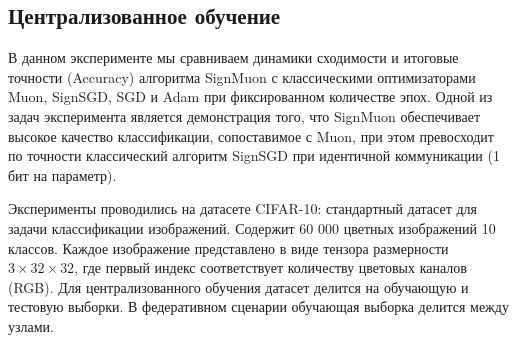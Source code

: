 \documentclass{article}
\begin{document}
\subsection{Централизованное обучение}
В данном эксперименте мы сравниваем динамики сходимости и итоговые точности (Accuracy) алгоритма SignMuon с классическими оптимизаторами Muon, SignSGD, SGD и Adam при фиксированном количестве эпох. Одной из задач эксперимента является демонстрация того, что SignMuon обеспечивает высокое качество классификации, сопоставимое с Muon, при этом превосходит по точности классический алгоритм SignSGD при идентичной коммуникации (1 бит на параметр).  


Эксперименты проводились на датасете CIFAR-10: стандартный датасет для задачи классификации изображений. Содержит 60 000 цветных изображений 10 классов. Каждое изображение представлено в виде тензора размерности $3 \times 32 \times 32$, где первый индекс соответствует количеству цветовых каналов (RGB). Для централизованного обучения датасет делится на обучающую и тестовую выборки. В федеративном сценарии обучающая выборка делится между узлами.
\end{document}
